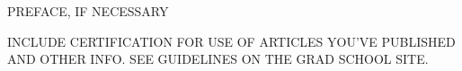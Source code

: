 
PREFACE, IF NECESSARY

INCLUDE CERTIFICATION FOR USE OF ARTICLES YOU'VE PUBLISHED AND OTHER
INFO.  SEE GUIDELINES ON THE GRAD SCHOOL SITE.
